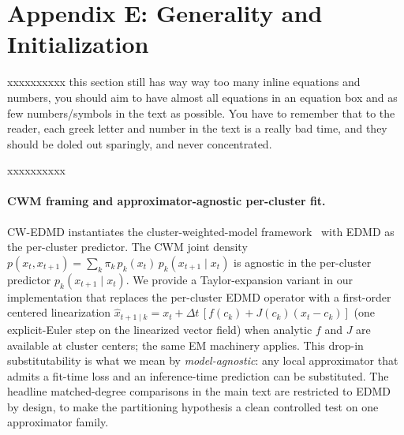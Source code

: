 \documentclass{article}
\begin{document}
\section*{Appendix E: Generality and Initialization}

xxxxxxxxxx
this section still has way way too many inline equations and numbers, you should aim to have almost all equations in an equation box and as few numbers/symbols in the text as possible. You have to remember that to the reader, each greek letter and number in the text is a really bad time, and they should be doled out sparingly, and never concentrated. 

xxxxxxxxxx

\paragraph{CWM framing and approximator-agnostic per-cluster fit.} CW-EDMD instantiates the cluster-weighted-model framework~\citep{gershenfeld1999nature,ingrassia2014linear,punzo2014polynomial} with EDMD as the per-cluster predictor. The CWM joint density $p(x_t, x_{t+1}) = \sum_k \pi_k\, p_k(x_t)\, p_k(x_{t+1}\mid x_t)$ is agnostic in the per-cluster predictor $p_k(x_{t+1}\mid x_t)$. We provide a Taylor-expansion variant in our implementation that replaces the per-cluster EDMD operator with a first-order centered linearization $\hat{x}_{t+1\mid k} = x_t + \Delta t\,[f(c_k) + J(c_k)(x_t - c_k)]$ (one explicit-Euler step on the linearized vector field) when analytic $f$ and $J$ are available at cluster centers; the same EM machinery applies. This drop-in substitutability is what we mean by \emph{model-agnostic}: any local approximator that admits a fit-time loss and an inference-time prediction can be substituted. The headline matched-degree comparisons in the main text are restricted to EDMD by design, to make the partitioning hypothesis a clean controlled test on one approximator family.
\end{document}
